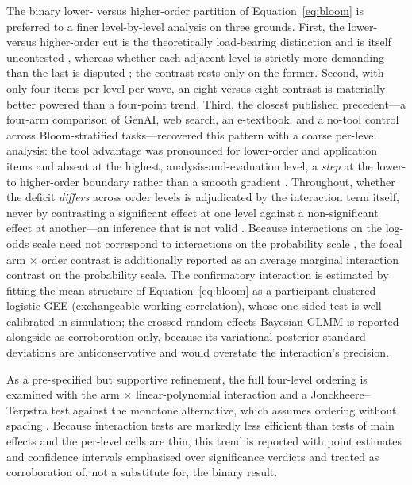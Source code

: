 The binary lower- versus higher-order partition of Equation~\eqref{eq:bloom} is preferred to a finer level-by-level analysis on three grounds. First, the lower- versus higher-order cut is the theoretically load-bearing distinction and is itself uncontested \parencite{anderson2001}, whereas whether each adjacent level is strictly more demanding than the last is disputed \parencite{hamamotofilho2020,ravand2025}; the contrast rests only on the former. Second, with only four items per level per wave, an eight-versus-eight contrast is materially better powered than a four-point trend. Third, the closest published precedent---a four-arm comparison of GenAI, web search, an e-textbook, and a no-tool control across Bloom-stratified tasks---recovered this pattern with a coarse per-level analysis: the tool advantage was pronounced for lower-order and application items and absent at the highest, analysis-and-evaluation level, a \emph{step} at the lower- to higher-order boundary rather than a smooth gradient \parencite{akgun2025}. Throughout, whether the deficit \emph{differs} across order levels is adjudicated by the interaction term itself, never by contrasting a significant effect at one level against a non-significant effect at another---an inference that is not valid \parencite{nieuwenhuis2011,gelman2006}. Because interactions on the log-odds scale need not correspond to interactions on the probability scale \parencite{ainorton2003}, %
the focal arm $\times$ order contrast is additionally reported as an average marginal interaction contrast on the probability scale. The confirmatory interaction is estimated by fitting the mean structure of Equation~\eqref{eq:bloom} as a participant-clustered logistic GEE (exchangeable working correlation), whose one-sided test is well calibrated in simulation; the crossed-random-effects Bayesian GLMM is reported alongside as corroboration only, because its variational posterior standard deviations are anticonservative and would overstate the interaction's precision.

As a pre-specified but supportive refinement, the full four-level ordering is examined with the arm $\times$ linear-polynomial interaction and a Jonckheere--Terpstra test against the monotone alternative, which assumes ordering without spacing \parencite{jonckheere1954}. Because interaction tests are markedly less efficient than tests of main effects \parencite{mcclelland1993} and the per-level cells are thin, this trend is reported with point estimates and confidence intervals emphasised over significance verdicts \parencite{frumento2025} and treated as corroboration of, not a substitute for, the binary result.

